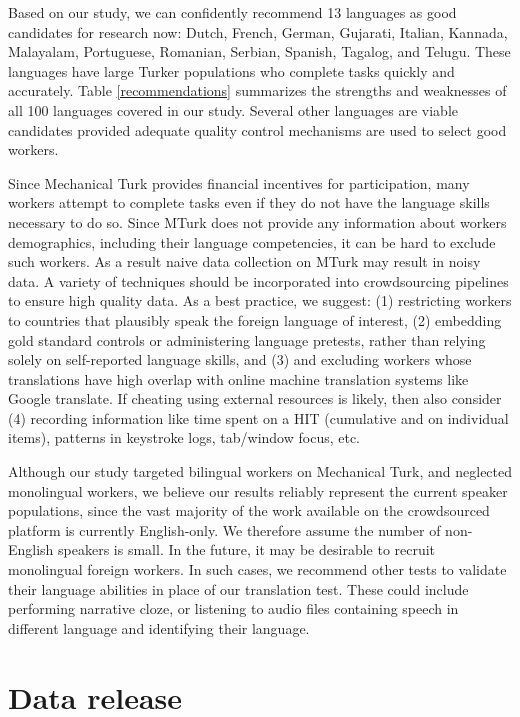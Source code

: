\documentclass[11pt]{article}
\begin{document}
Based on our study, we can confidently recommend 13 languages as good candidates for research now: Dutch, French, German, Gujarati, Italian, Kannada, Malayalam, Portuguese, Romanian, Serbian, Spanish, Tagalog, and Telugu. These languages have large Turker populations who complete tasks quickly and accurately. Table \ref{recommendations} summarizes the strengths and weaknesses of all 100 languages covered in our study.  Several other languages are viable candidates provided adequate quality control mechanisms are used to select good workers.

Since Mechanical Turk provides financial incentives for participation, many workers attempt to complete tasks even if they do not have the language skills necessary to do so.  Since MTurk does not provide any information about workers demographics, including their language competencies, it can be hard to exclude such workers.  As a result naive data collection on MTurk may result in noisy data.  A variety of techniques should be incorporated into crowdsourcing pipelines to ensure high quality data.  As a best practice, we suggest: (1) restricting workers to countries that plausibly speak the foreign language of interest, (2) embedding gold standard controls or administering language pretests, rather than relying solely on self-reported language skills, and (3) and excluding workers whose translations have high overlap with online machine translation systems like Google translate.  If cheating using external resources is likely, then also consider (4) recording information like time spent on a HIT (cumulative and on individual items), patterns in keystroke logs, tab/window focus, etc.

Although our study targeted bilingual workers on Mechanical Turk, and neglected monolingual workers, we believe our results reliably represent the current speaker populations, since the vast majority of the work available on the crowdsourced platform is currently English-only.  We therefore assume the number of non-English speakers is small.  In the future, it may be desirable to recruit monolingual foreign workers.  In such cases, we recommend other tests to validate their language abilities in place of our translation test.  These could include performing narrative cloze, or listening to audio files containing speech in different language and identifying their language. 



\section{Data release}
\end{document}
